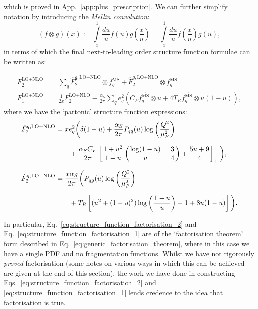 \documentclass[withindex,glossary]{cam-thesis}
\begin{document}
which is proved in App.~\ref{app:plus_prescription}. We can further simplify notation by introducing the \textit{Mellin convolution}:
\begin{equation}
(f \otimes g)(x) := \int\limits_{x}^{1} \frac{du}{u} f(u) g\left( \frac{x}{u} \right) = \int\limits_{x}^{1} \frac{du}{u} f\left( \frac{x}{u} \right) g(u),
\end{equation}
in terms of which the final next-to-leading order structure function formulae can be written as:
\begin{framed}
\begin{align}
\label{eq:structure_function_factorisation_2}
F_2^{\text{LO+NLO}} &=\sum_{q} \hat{F}_2^{q,\text{LO+NLO}} \otimes f_q^{\overline{\text{MS}}} + \hat{F}_2^{g,\text{LO+NLO}} \otimes f_g^{\overline{\text{MS}}} \\[1.5ex]
\label{eq:structure_function_factorisation_1}
F_1^{\text{LO+NLO}} &= \frac{1}{2x} F_2^{\text{LO+NLO}} - \frac{\alpha_S}{2\pi} \sum_{q} e_q^2 \left( C_F f_q^{\overline{\text{MS}}} \otimes u + 4T_R f_g^{\overline{\text{MS}}} \otimes u(1-u) \right),
\end{align}
where we have the `partonic' structure function expressions:
\begin{align}
\hat{F}_2^{q,\text{LO+NLO}} &= xe_q^2 \bigg( \delta(1-u) + \frac{\alpha_S}{2\pi} P_{qq}(u) \log\left( \frac{Q^2}{\mu_F^2} \right)\notag \\[1.5ex]
&\qquad + \frac{\alpha_S C_F}{2\pi} \left[ \frac{1+u^2}{1-u} \left( \frac{\log(1-u)}{u} - \frac{3}{4} \right) + \frac{5u + 9}{4}\right]_+\bigg), \\[1.5ex]
\hat{F}_2^{g,\text{LO+NLO}} &= \frac{x\alpha_S}{2\pi} \bigg( P_{qg}(u) \log\left( \frac{Q^2}{\mu_F^2}\right) \notag \\[1.5ex]
&\qquad + T_R \left[ (u^2 + (1-u)^2) \log\left( \frac{1-u}{u} \right) - 1 + 8u(1-u)\right] \bigg).
\end{align}
\end{framed}
\noindent In particular, Eq.~\eqref{eq:structure_function_factorisation_2} and Eq.~\eqref{eq:structure_function_factorisation_1} are of the `factorisation theorem' form described in Eq.~\eqref{eq:generic_factorisation_theorem}, where in this case we have a single PDF and no fragmentation functions. Whilst we have not rigorously \textit{proved} factorisation (some notes on various ways in which this can be achieved are given at the end of this section), the work we have done in constructing Eqs.~\eqref{eq:structure_function_factorisation_2} and \eqref{eq:structure_function_factorisation_1} lends credence to the idea that factorisation is true.
\end{document}
